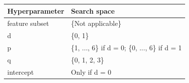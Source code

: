\begin{tabularx}{\textwidth}{@{}lX@{}}
\toprule
\textbf{Hyperparameter} & \textbf{Search space} \\
\midrule
feature subset & \{Not applicable\} \\
\addlinespace
d & \{0, 1\} \\
\addlinespace
p & \{1, ..., 6\} if d = 0; \{0, ..., 6\} if d = 1 \\
\addlinespace
q & \{0, 1, 2, 3\} \\
\addlinespace
intercept & Only if d = 0 \\
\bottomrule
\end{tabularx}
